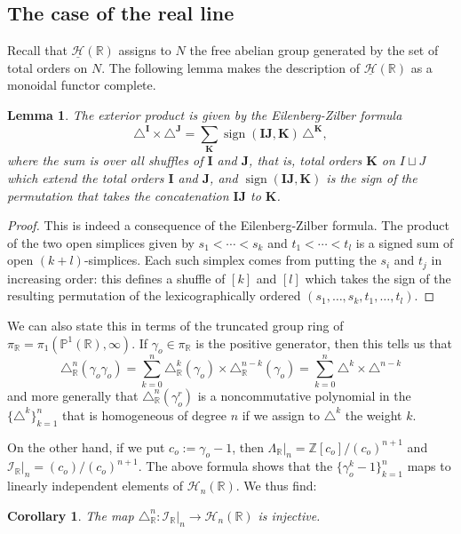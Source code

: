 \documentclass[12pt,letterpaper]{amsart}
\numberwithin{equation}{section}
\def\Kbold{{\mathbf K}}
\def\PP{{\mathbb P}}
\def\RR{{\mathbb R}}
\def\ZZ{{\mathbb Z}}
\def\Ibold{\mathbf {I}}
\def\Jbold{\mathbf {J}}
\def\g{\gamma}
\def\tri{\triangle}
\def\Hcal{{\mathcal H}}
\def\Ical{{\mathcal I}}
\def\uHcal{{\underline\Hcal}}
\newcommand\sign{\operatorname{sign}}
\newtheorem{lemma}[theorem]{Lemma}
\newtheorem{corollary}[theorem]{Corollary}
\theoremstyle{remark}
\begin{document}
\subsection{The case of the real line}\label{subsect:R}
Recall that  $\uHcal(\RR)$ assigns to $N$ the free abelian group generated by the set of total orders on  $N$. The following lemma makes the  description of
$\uHcal(\RR)$ as a monoidal functor complete.

\begin{lemma}\label{lemma:EZformula}
The exterior product is  given by the Eilenberg-Zilber formula
\[
\textstyle \tri^\Ibold\times \tri^\Jbold=\sum_\Kbold \sign(\Ibold\Jbold,\Kbold) \hspace{2pt} \tri^\Kbold, 
\]
where  the sum is over all  shuffles  of $\Ibold$ and $\Jbold$,  that is,  total orders $\Kbold$ on $I\sqcup J$ which extend the 
total orders $\Ibold$ and $\Jbold$, and $\sign(\Ibold\Jbold, \Kbold)$ is the sign of the permutation 
that takes  the concatenation $\Ibold\Jbold$ to $\Kbold$.
\end{lemma}
\begin{proof}
This is indeed a consequence of the  Eilenberg-Zilber formula.
The product  of the  two open simplices given by $s_1<\cdots <s_k$ and $t_1<\cdots <t_l$ is a signed sum of open $(k+l)$-simplices. Each such simplex comes from putting the $s_i$ and $t_j$ in increasing order: this defines a shuffle of $[k]$ and $[l]$ which  takes the sign of the resulting permutation of the lexicographically ordered  $(s_1, \dots ,s_k, t_1,  \dots ,t_l)$.
\end{proof}

We can also state this in terms of the truncated group ring of $\pi_\RR=\pi_1( \PP^1(\RR), \infty)$.  
If $\g_o\in \pi_\RR$ is the positive  generator, then this tells us that 
\[
\textstyle \tri^n_\RR(\g_o\g_o)=\sum_{k=0}^n \tri^k_\RR(\g_o)\times \tri^{n-k}_\RR(\g_o)=\sum_{k=0}^n \tri^k\times \tri^{n-k}
\]
 and more generally that
$\tri^n_\RR(\g_o^r)$ is a noncommutative polynomial in the $\{\tri^k\}_{k=1}^n$ that is homogeneous of degree $n$
if we assign to  $\tri^k$ the weight $k$.

On the other hand, if we put $c_o:=\g_o-1$, then  $\Lambda_\RR|_n =\ZZ[c_o]/(c_o)^{n+1}$ and $\Ical_\RR|_n=(c_o)/(c_o)^{n+1}$.
The above formula shows that the  $\{\g_o^k-1\}_{k=1}^n$ maps to linearly independent elements
of $\Hcal_n(\RR)$. We thus find: 

\begin{corollary}\label{cor:}
The map $\tri^n_\RR: \Ical_\RR|_n\to \Hcal_n(\RR)$ is injective.
\end{corollary}
\end{document}
